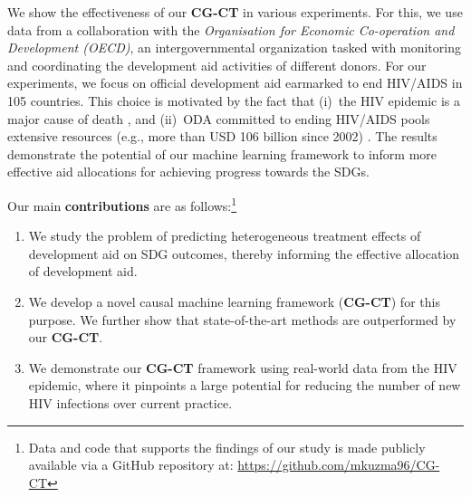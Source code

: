 \documentclass[sigconf]{acmart}
\newcommand{\framework}{\textbf{\mbox{CG-CT}}\xspace}
\begin{document}
We show the effectiveness of our \framework in various experiments. For this, we use data from a collaboration with the \emph{Organisation for Economic Co-operation and Development (OECD)}, an intergovernmental organization tasked with monitoring and coordinating the development aid activities of different donors. For our experiments, we focus on official development aid earmarked to end HIV/AIDS in 105 countries. This choice is motivated by the fact that (i)~the HIV epidemic is a major cause of death \cite{UNhiv2020, WHOhiv2020, UNAIDShiv2022}, and (ii)~ODA committed to ending HIV/AIDS pools extensive resources (e.g., more than USD 106 billion since 2002)  \cite{OECDsdgdata2022}. 
The results demonstrate the potential of our machine learning framework to inform more effective aid allocations for achieving progress towards the SDGs. 

Our main \textbf{contributions} are as follows:\footnote{Data and code that supports the findings of our study is made publicly available via a GitHub repository at: \url{https://github.com/mkuzma96/CG-CT}}
\begin{enumerate}[leftmargin=0.6cm] 
\item We study the problem of predicting heterogeneous treatment effects of development aid on SDG outcomes, thereby informing the effective allocation of development aid. 
\item We develop a novel causal machine learning framework (\framework) for this purpose. We further show that state-of-the-art methods are outperformed by our \framework.  
\item We demonstrate our \framework framework using real-world data from the HIV epidemic, where it pinpoints a large potential for reducing the number of new HIV infections over current practice. 
\end{enumerate}
\end{document}
